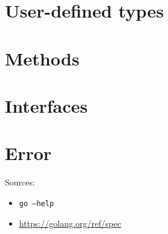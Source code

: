 \documentclass{article}
\begin{document}
\begin{multicols*}{3}
  \section*{User-defined types}

  \filbreak
  \section*{Methods}

  \filbreak
  \section*{Interfaces}

  \filbreak
  \section*{Error}

  \parbox{\columnwidth}{
    Sources:
    \begin{itemize}[nosep]
    \item \texttt{go --help}
    \item \url{https://golang.org/ref/spec}
    \end{itemize}

    \vspace{\baselineskip}
    \begin{center}
      \doclicenseText\\[0.25\baselineskip]

      \doclicenseImage
    \end{center}
  }
\end{multicols*}
\end{document}
